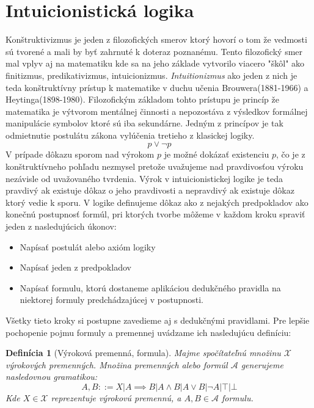 \documentclass[a4paper,10pt,oneside]{report}%
\newtheorem{definition}{Definícia}[chapter]
\begin{document}
\section{Intuicionistická logika}
    Konštruktivizmus je jeden z filozofických smerov ktorý hovorí o tom že vedmosti
sú tvorené a mali by byť zahrnuté k doteraz poznanému.
    Tento filozofický smer mal vplyv aj na matematiku kde sa na jeho základe
vytvorilo viacero "škôl" ako finitizmus, predikativizmus, intuicionizmus.
    \emph{Intuitionizmus} ako jeden z nich je teda konštruktívny prístup k matematike
v duchu učenia Brouwera(1881-1966) a Heytinga(1898-1980).
    Filozofickým základom tohto prístupu je princíp že matematika je výtvorom mentálnej
činnosti a nepozostáva z výsledkov formálnej manipulácie symbolov ktoré sú iba
sekundárne.
    Jedným z princípov je tak odmietnutie postulátu zákona vylúčenia tretieho
z klasickej logiky.
\begin{equation}
    p \vee \neg p
\end{equation}
    V prípade dôkazu sporom nad výrokom $p$ je možné dokázať existenciu $p$,
čo je z konštruktívneho pohľadu nezmysel pretože uvažujeme nad pravdivosťou
    výroku nezávisle od uvažovaného tvrdenia.
Výrok v intuicionistickej logike je teda pravdivý ak existuje dôkaz o jeho pravdivosti
a nepravdivý ak existuje dôkaz ktorý vedie k sporu.
    V logike definujeme dôkaz ako z nejakých predpokladov ako konečnú postupnosť
formúl, pri ktorých tvorbe môžeme v každom kroku spraviť jeden z nasledujúcich
úkonov:
\begin{itemize}
    \item Napísať postulát alebo axióm logiky
    \item Napísať jeden z predpokladov
    \item Napísať formulu, ktorú dostaneme aplikáciou dedukčného pravidla na niektorej
formuly predchádzajúcej v postupnosti.
\end{itemize}
    Všetky tieto kroky si postupne zavedieme aj s dedukčnými pravidlami.
    Pre lepšie pochopenie pojmu formuly a premennej uvádzame ich nasledujúcu definíciu:
\begin{definition}[Výroková premenná, formula]
    Majme spočítateľnú množinu $\mathcal{X}$ výrokových premenných. Množina premenných
    alebo formúl $\mathcal{A}$ generujeme nasledovnou gramatikou:
    \begin{equation}
        A, B ::= X | A \implies B | A \wedge B | A \vee B | \neg A | \top | \bot
    \end{equation}
    Kde $X \in \mathcal{X}$ reprezentuje výrokovú premennú, a $A, B \in \mathcal{A}$
    formulu.
\end{definition}
\end{document}
